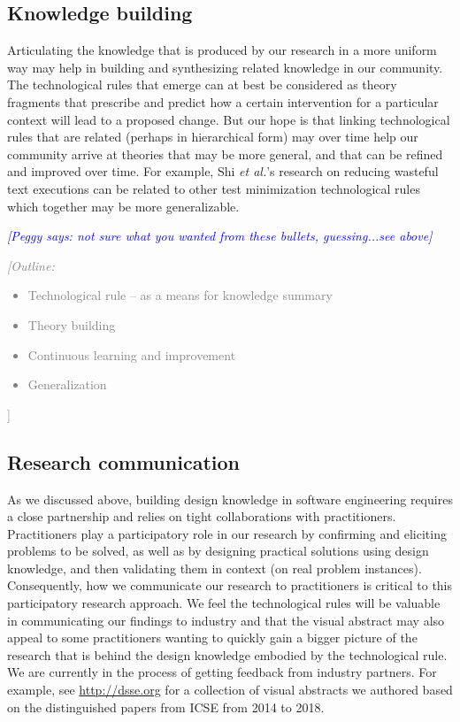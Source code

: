 \documentclass[graybox]{svmult}
\newcommand{\peggy}[1]{\textcolor{blue}{{\it [Peggy says: #1]}}}
\newcommand{\outline}[1]{\textcolor{gray}{{\it [Outline: #1]}}}
\newcommand{\peggy}[1]{}
\newcommand{\outline}[1]{}
\begin{document}
{\subsection{Knowledge building}
\label{sec:knowledge}

Articulating the knowledge that is produced by our research in a more uniform way may help in building and synthesizing related knowledge in our community. 
The technological rules that emerge can at best be considered as theory fragments that prescribe and predict how a certain intervention for a particular context will lead to a proposed change. 
But our hope is that linking technological rules that are related (perhaps in hierarchical form) may over time help our community arrive at theories that may be more general, and that can be refined and improved over time. 
For example, Shi \emph{et al.}'s research on reducing wasteful text executions can be related to other test minimization technological rules which together may be more generalizable. 

\peggy{ not sure what you wanted from these bullets, guessing...see above}
\outline{
\begin{itemize}
\item Technological rule -- as a means for knowledge summary
\item Theory building
\item Continuous learning and improvement
\item Generalization
\end{itemize}
}

\subsection{Research communication}
\label{sec:communication}

As we discussed above, building design knowledge in software engineering requires a close partnership and relies on tight collaborations with practitioners. 
Practitioners play a participatory role in our research by confirming and eliciting problems to be solved, as well as by designing practical solutions using design knowledge, and then validating them in context (on real problem instances). 
Consequently, how we communicate our research to practitioners is critical to this participatory research approach. 
We feel the technological rules will be valuable in communicating our findings to industry and that the visual abstract may also appeal to some practitioners wanting to quickly gain a bigger picture of the research that is behind the design knowledge embodied by the technological rule. 
We are currently in the process of getting feedback from industry partners.  For example, see \url{http://dsse.org} for a collection of visual abstracts we authored based on the distinguished papers from ICSE from 2014 to 2018.  

}
\end{document}
